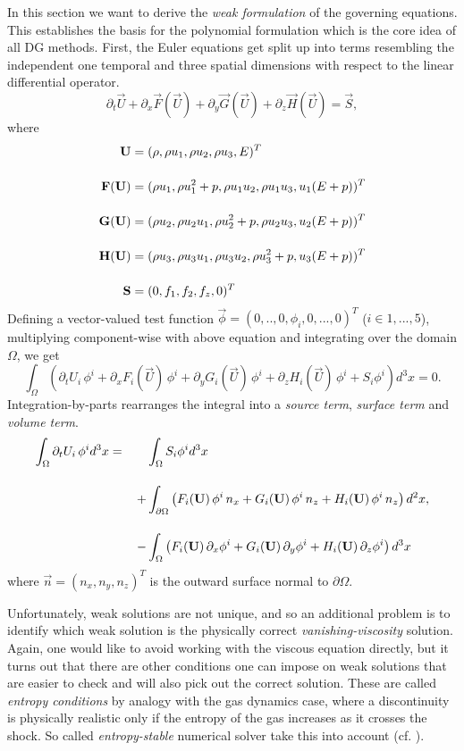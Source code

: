 In this section we want to derive the \emph{weak formulation} of the governing
equations. This establishes the basis for the polynomial formulation which is
the core idea of all DG methods.  First, the Euler equations get split up into
terms resembling the independent one temporal and three spatial
dimensions with respect to the linear differential operator.
\begin{equation}
\partial_t \vec{U} + \partial_x\vec{F}(\vec{U})+ \partial_y\vec{G}(\vec{U}) + \partial_z\vec{H}(\vec{U}) = \vec{S},
\end{equation}
where
\begin{align}
    \vec{U} &= (\dens, \dens\vels_1, \dens\vels_2, \dens\vels_3, \Ener)^T\br
    \vec{F}(\vec{U}) &= (\dens\vels_1, \dens\vels_1^2 + \pres, \dens\vels_1\vels_2, \dens\vels_1\vels_3, \vels_1(\Ener + \pres))^T\br
    \vec{G}(\vec{U}) &= (\dens\vels_2, \dens\vels_2\vels_1, \dens\vels_2^2 + \pres, \dens\vels_2\vels_3, \vels_2(\Ener + \pres))^T\br
    \vec{H}(\vec{U}) &= (\dens\vels_3, \dens\vels_3\vels_1, \dens\vels_3\vels_2, \dens\vels_3^2 + \pres, \vels_3(\Ener + \pres))^T\br
    \vec{S} &= (0,f_1,f_2,f_z,0)^T
\end{align}
Defining a vector-valued test function $\vec{\phi} = (0,..,0,\phi_i,0,...,0)^T$
($i\in{1,...,5}$), multiplying component-wise with above equation and
integrating over the domain $\Omega$, we get
\begin{equation}
    \int_\Omega \left( \partial_tU_i\,\phi^i 
        + \partial_x F_i(\vec{U})\,\phi^i 
        + \partial_y G_i(\vec{U})\,\phi^i 
        + \partial_z H_i(\vec{U})\,\phi^i + S_i \phi^i \right) d^3x = 0.
\end{equation}
Integration-by-parts rearranges the integral into a \emph{source term},
\emph{surface term} and \emph{volume term}.
\begin{align}
\label{eqn:weak-formulation}
    \int_\Omega \partial_t U_i\,\phi^i d^3x = \;\;\;\;\;\;\;&\int_\Omega S_i \phi^i d^3x \br
    +& \int_{\partial\Omega} \left(F_i(\vec{U})\,\phi^i\,n_x + G_i(\vec{U})\,\phi^i\,n_z + H_i(\vec{U})\,\phi^i\,n_z \right) d^2x,\nonumber \br
    -& \int_\Omega \left(F_i(\vec{U})\,\partial_x \phi^i + G_i(\vec{U})\,\partial_y \phi^i + H_i(\vec{U})\,\partial_z \phi^i \right) d^3x
\end{align}
where $\vec{n} = (n_x,n_y,n_z)^T$ is the outward surface normal to $\partial\Omega$.

Unfortunately, weak solutions are not unique, and so an additional problem is
to identify which weak solution is the physically correct \emph{vanishing-viscosity}
solution. Again, one would like to avoid working with the viscous equation
directly, but it turns out that there are other conditions one can impose on
weak solutions that are easier to check and will also pick out the correct
solution. These are called \emph{entropy conditions} by analogy with the gas
dynamics case, where a discontinuity is physically realistic only if the
entropy of the gas increases as it crosses the shock. So called \emph{entropy-stable}
numerical solver take this into account (cf. \cite{derigs2016novel}).
